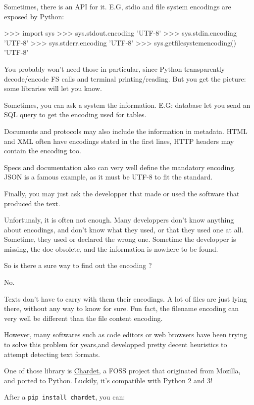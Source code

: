 Sometimes, there is an API for it. E.G, stdio and file system encodings are exposed by Python:

\begin{py2and3}
>>> import sys
>>> sys.stdout.encoding
'UTF-8'
>>> sys.stdin.encoding
'UTF-8'
>>> sys.stderr.encoding
'UTF-8'
>>> sys.getfilesystemencoding()
'UTF-8'
\end{py2and3}

You probably won't need those in particular, since Python transparently decode/encode FS calls and terminal printing/reading. But you get the picture: some libraries will let you know.

Sometimes, you can ask a system the information. E.G: database let you send an SQL query to get the encoding used for tables.

Documents and protocols may also include the information in metadata. HTML and XML often have encodings stated in the first lines, HTTP headers may contain the encoding too.

Specs and documentation also can very well define the mandatory encoding. JSON is a famous example, as it must be UTF-8 to fit the standard.

Finally, you may just ask the developper that made or used the software that produced the text.

Unfortunaly, it is often not enough. Many developpers don't know anything about encodings, and don't know what they used, or that they used one at all. Sometime, they used or declared the wrong one. Sometime the developper is missing, the doc obsolete, and the information is nowhere to be found.

So is there a sure way to find out the encoding ?

No.

Texts don't have to carry with them their encodings. A lot of files are just lying there, without any way to know for sure. Fun fact, the filename encoding can very well be different than the file content encoding.

However, many softwares such as code editors or web browsers have been trying to solve this problem for years,and developped pretty decent heuristics to attempt detecting text formats.

One of those library is \href{https://pypi.org/project/chardet/}{Chardet}, a FOSS project that originated from Mozilla, and ported to Python. Luckily, it's compatible with Python 2 and 3!

After a \lstinline{pip install chardet}, you can:

